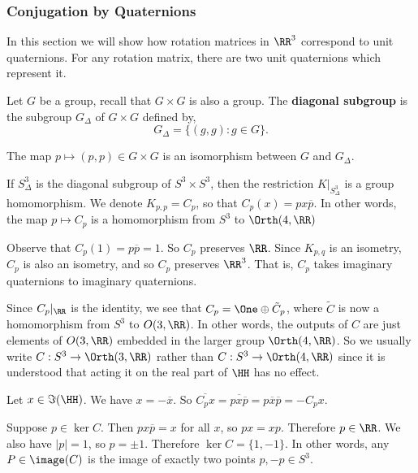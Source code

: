 \subsubsection{Conjugation by Quaternions}
In this section we will show how rotation matrices in $\RR^3$ correspond to unit quaternions. For any rotation matrix, there are two unit quaternions which represent it.
\begin{defn}
    Let $G$ be a group, recall that $G\times G$ is also a group. The \textbf{diagonal subgroup} is the subgroup $G_\Delta$ of $G\times G$ defined by, 
    \[G_\Delta = \{(g,g):g\in G\}.\]
\end{defn}
\begin{remark*}
    The map $p \mapsto (p,p)\in G\times G$ is an isomorphism between $G$ and $G_\Delta$.
\end{remark*}
\begin{remark*}
    If $S^3_\Delta$ is the diagonal subgroup of $S^3\times S^3$, then the restriction $K|_{S^3_\Delta}$ is a group homomorphism. We denote $K_{p,p} = C_p$, so that $C_p(x) = px\overline{p}$. In other words, the map $p \mapsto C_p$ is a homomorphism from $S^3$ to $\Orth(4,\RR)$
\end{remark*}
\begin{remark*}
    Observe that $C_p(1) = p\overline{p}=1$. So $C_p$ preserves $\RR$. Since $K_{p,q}$ is an isometry, $C_p$ is also an isometry, and so $C_p$ preserves $\RR^3$. That is, $C_p$ takes imaginary quaternions to imaginary quaternions.
\end{remark*}
\begin{remark*}
    Since $C_p|_{\RR}$ is the identity, we see that $C_p = \One \oplus \tilde{C}_p$, where $\tilde{C}$ is now a homomorphism from $S^3$ to $O(3,\RR)$. In other words, the outputs of $C$ are just elements of $O(3,\RR)$ embedded in the larger group $\Orth(4,\RR)$. So we usually write $C : S^3\to \Orth(3,\RR)$ rather than $C : S^3 \to \Orth(4,\RR)$ since it is understood that acting it on the real part of $\HH$ has no effect.
\end{remark*}
\begin{remark*}
    Let $x\in \Im(\HH)$. We have $x=-\overline{x}$. So $\overline{C_p x} = \overline{px\overline{p}} = p\overline{x}\overline{p} = -C_p x$.
\end{remark*}
\begin{remark*}
    Suppose $p \in \ker C$. Then $px\overline{p} = x$ for all $x$, so $px=xp$. Therefore $p\in \RR$. We also have $|p|=1$, so $p = \pm 1$. Therefore $\ker C = \{1,-1\}$. In other words, any $P \in \image(C) $ is the image of exactly two points $p,-p \in S^3$.
\end{remark*}
